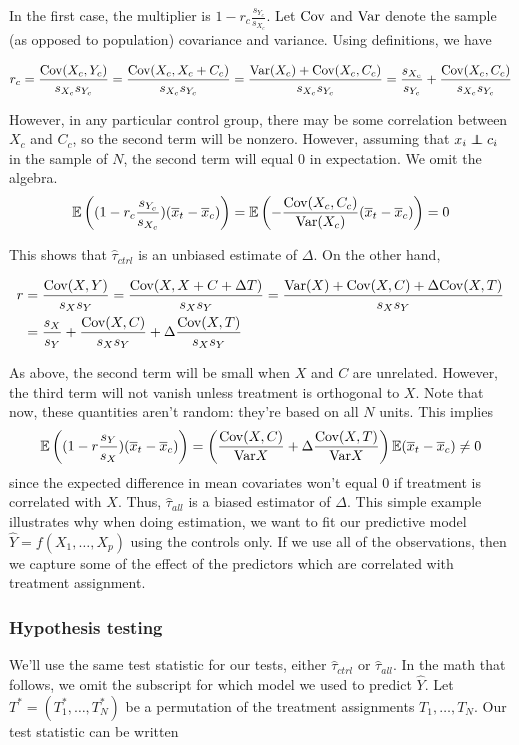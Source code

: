 In the first case, the multiplier is $1 - r_c\frac{s_{Y_c}}{s_{X_c}}$.  Let $\textrm{Cov}$ and $\textrm{Var}$ denote the sample (as opposed to population) covariance and variance.  Using definitions, we have

$$r_c = \frac{\textrm{Cov}(X_c, Y_c)}{s_{X_c}s_{Y_c}} = \frac{\textrm{Cov}(X_c, X_c + C_c)}{s_{X_c}s_{Y_c}} = \frac{\textrm{Var}(X_c) + \textrm{Cov}(X_c, C_c)}{s_{X_c}s_{Y_c}}   = \frac{s_{X_c}}{s_{Y_c}} + \frac{\textrm{Cov}(X_c, C_c)}{s_{X_c}s_{Y_c}}$$

However, in any particular control group, there may be some correlation between $X_c$ and $C_c$, so the second term will be nonzero. 
However, assuming that $x_i \independent c_i$ in the sample of $N$, the second term will equal $0$ in expectation.  
We omit the algebra.
$$\mathbb{E}\left( (1 - r_c\frac{s_{Y_c}}{s_{X_c}})(\overline{x}_t - \overline{x}_c) \right) = \mathbb{E}\left( -\frac{\textrm{Cov}(X_c, C_c)}{\textrm{Var}(X_c)}(\overline{x}_t - \overline{x}_c) \right) = 0$$

\noindent This shows that $\hat{\tau}_{ctrl}$ is an unbiased estimate of $\Delta$.  On the other hand,

\begin{align*}
r &= \frac{\textrm{Cov}(X, Y)}{s_{X}s_{Y}} = \frac{\textrm{Cov}(X, X + C + \Delta T)}{s_{X}s_{Y}} = \frac{\textrm{Var}(X) + \textrm{Cov}(X, C) + \Delta\textrm{Cov}(X, T)}{s_{X}s_{Y}} \\
&= \frac{s_{X}}{s_{Y}} + \frac{\textrm{Cov}(X, C)}{s_{X}s_{Y}} + \Delta\frac{\textrm{Cov}(X, T)}{s_{X}s_{Y}}
\end{align*}

As above, the second term will be small when $X$ and $C$ are unrelated. 
However, the third term will not vanish unless treatment is orthogonal to $X$.
Note that now, these quantities aren't random: they're based on all $N$ units.  
This implies
$$\mathbb{E}\left((1- r\frac{s_{Y}}{s_{X}})(\overline{x}_t - \overline{x}_c)\right) =\left( \frac{\textrm{Cov}(X, C)}{\textrm{Var}{X}} + \Delta \frac{\textrm{Cov}(X, T)}{\textrm{Var}{X}} \right) \mathbb{E}(\overline{x}_t - \overline{x}_c) \neq 0$$
\noindent since the expected difference in mean covariates won't equal $0$ if treatment is correlated with $X$.
Thus, $\hat{\tau}_{all}$ is a biased estimator of $\Delta$.  This simple example illustrates why when doing estimation, we want to fit our predictive model $\hat{Y} = f(X_1, \dots, X_p)$ using the controls only.  If we use all of the observations, then we capture some of the effect of the predictors which are correlated with treatment assignment.

\subsubsection{Hypothesis testing}
We'll use the same test statistic for our tests, either $\hat{\tau}_{ctrl}$ or $\hat{\tau}_{all}$.
In the math that follows, we omit the subscript for which model we used to predict $\hat{Y}$.
Let $T^* = (T_1^*, \dots, T_N^*)$ be a permutation of the treatment assignments $T_1, \dots, T_N$.
Our test statistic can be written

